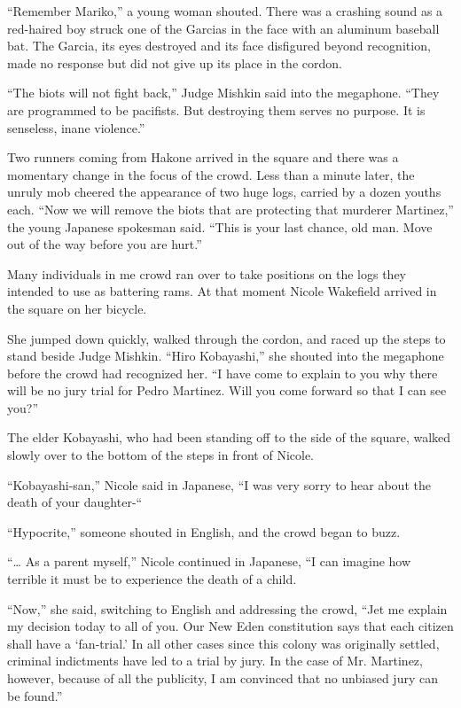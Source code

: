 \documentclass[]{article}
\begin{document}
{“Remember Mariko,” a young woman shouted. There was a crashing sound as a red-haired boy struck one of the Garcias in the face with an aluminum baseball bat. The Garcia, its eyes destroyed and its face disfigured beyond recognition, made no response but did not give up its place in the cordon.

“The biots will not fight back,” Judge Mishkin said into the megaphone. “They are programmed to be pacifists. But destroying them serves no purpose. It is senseless, inane violence.”

Two runners coming from Hakone arrived in the square and there was a momentary change in the focus of the crowd. Less than a minute later, the unruly mob cheered the appearance of two huge logs, carried by a dozen youths each. “Now we will remove the biots that are protecting that murderer Martinez,” the young Japanese spokesman said. “This is your last chance, old man. Move out of the way before you are hurt.”

Many individuals in me crowd ran over to take positions on the logs they intended to use as battering rams. At that moment Nicole Wakefield arrived in the square on her bicycle.

She jumped down quickly, walked through the cordon, and raced up the steps to stand beside Judge Mishkin. “Hiro Kobayashi,” she shouted into the megaphone before the crowd had recognized her. “I have come to explain to you why there will be no jury trial for Pedro Martinez. Will you come forward so that I can see you?”

The elder Kobayashi, who had been standing off to the side of the square, walked slowly over to the bottom of the steps in front of Nicole.

“Kobayashi-san,” Nicole said in Japanese, “I was very sorry to hear about the death of your daughter-“

“Hypocrite,” someone shouted in English, and the crowd began to buzz.

“… As a parent myself,” Nicole continued in Japanese, “I can imagine how terrible it must be to experience the death of a child.

“Now,” she said, switching to English and addressing the crowd, “Jet me explain my decision today to all of you. Our New Eden constitution says that each citizen shall have a ‘fan-trial.’ In all other cases since this colony was originally settled, criminal indictments have led to a trial by jury. In the case of Mr. Martinez, however, because of all the publicity, I am convinced that no unbiased jury can be found.”

}
\end{document}
